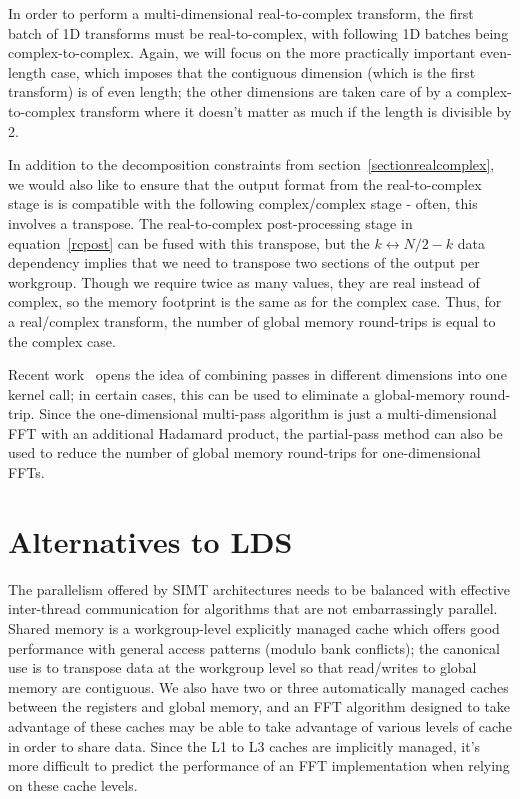 \documentclass[blind]{gtac}
\begin{document}
In order to perform a multi-dimensional real-to-complex transform, the
first batch of 1D transforms must be real-to-complex, with following
1D batches being complex-to-complex.  Again, we will focus on the more
practically important even-length case, which imposes that the
contiguous dimension (which is the first transform) is of even length;
the other dimensions are taken care of by a complex-to-complex
transform where it doesn't matter as much if the length is divisible
by 2.

In addition to the decomposition constraints from
section~\ref{sectionrealcomplex}, we would also like to ensure that
the output format from the real-to-complex stage is is compatible with
the following complex/complex stage - often, this involves a
transpose.  The real-to-complex post-processing stage in
equation~\eqref{rcpost} can be fused with this transpose, but the
$k\leftrightarrow{}N/2-k$ data dependency implies that we need to
transpose two sections of the output per workgroup.  Though we require
twice as many values, they are real instead of complex, so the memory
footprint is the same as for the complex case.  Thus, for a
real/complex transform, the number of global memory round-trips is
equal to the complex case.

Recent work~\cite{partialpassgtac} opens the idea of combining passes
in different dimensions into one kernel call; in certain cases, this
can be used to eliminate a global-memory round-trip.  Since the
one-dimensional multi-pass algorithm is just a multi-dimensional FFT
with an additional Hadamard product, the partial-pass method can also
be used to reduce the number of global memory round-trips for
one-dimensional FFTs.

\section{Alternatives to LDS}

The parallelism offered by SIMT architectures needs to be balanced
with effective inter-thread communication for algorithms that are not
embarrassingly parallel.  Shared memory is a workgroup-level
explicitly managed cache which offers good performance with general
access patterns (modulo bank conflicts); the canonical use is to
transpose data at the workgroup level so that read/writes to global
memory are contiguous.  We also have two or three automatically
managed caches between the registers and global memory, and an FFT
algorithm designed to take advantage of these caches may be able to
take advantage of various levels of cache in order to share data.
Since the L1 to L3 caches are implicitly managed, it's more difficult
to predict the performance of an FFT implementation when relying on
these cache levels.
\end{document}
